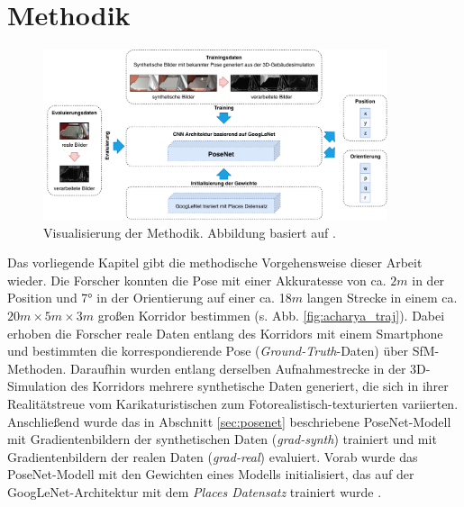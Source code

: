 
\section{Methodik}
\label{sec:kapitel_3}

\begin{figure}[t]
	\centering
	\includegraphics[width=0.9\textwidth]{images/methodik/methodik.pdf}
	\caption{Visualisierung der Methodik. Abbildung basiert auf \cite{acharyaBIMPoseNetIndoorCamera2019}.}
	\label{fig:methodik}
\end{figure}
Das vorliegende Kapitel gibt die methodische Vorgehensweise dieser Arbeit wieder. Die Forscher \citet{acharyaBIMPoseNetIndoorCamera2019} konnten die Pose mit einer Akkuratesse von ca. $2m$ in der Position und 7° in der Orientierung auf einer ca. 18$m$ langen Strecke in einem ca. $20m \times 5m \times 3m$ großen Korridor bestimmen (s. Abb. \ref{fig:acharya_traj}). Dabei erhoben die Forscher reale Daten entlang des Korridors mit einem Smartphone und bestimmten die korrespondierende Pose (\textit{Ground-Truth}-Daten) über SfM-Methoden. Daraufhin wurden entlang derselben Aufnahmestrecke in der 3D-Simulation des Korridors mehrere synthetische Daten generiert, die sich in ihrer Realitätstreue vom Karikaturistischen zum Fotorealistisch-texturierten variierten. Anschließend wurde das in Abschnitt \ref{sec:posenet} beschriebene PoseNet-Modell mit Gradientenbildern der synthetischen Daten (\textit{grad-synth}) trainiert und mit Gradientenbildern der realen Daten (\textit{grad-real}) evaluiert. Vorab wurde das PoseNet-Modell mit den Gewichten eines Modells initialisiert, das auf der GoogLeNet-Architektur mit dem \textit{Places Datensatz} \cite{NIPS2014_5349} trainiert wurde \cite{acharyaBIMPoseNetIndoorCamera2019}. 

